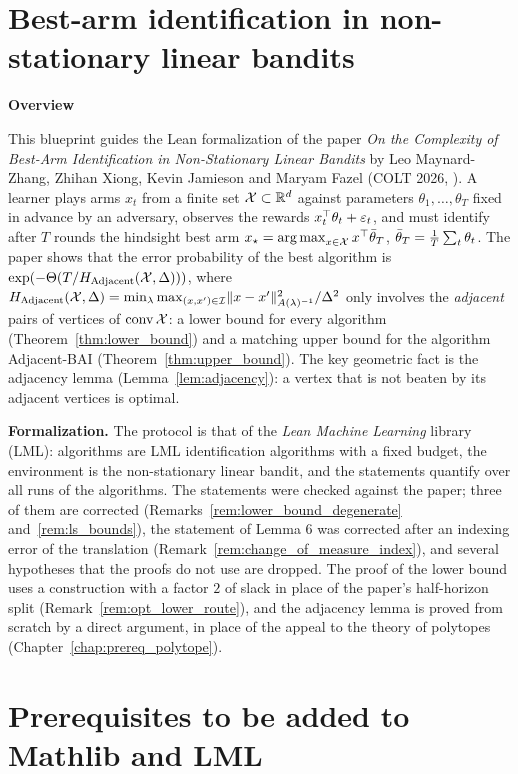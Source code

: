
\part{Best-arm identification in non-stationary linear bandits}
\label{part:main}

\textbf{Overview}

This blueprint guides the Lean formalization of the paper \emph{On the Complexity of Best-Arm
Identification in Non-Stationary Linear Bandits} by Leo Maynard-Zhang, Zhihan Xiong, Kevin Jamieson
and Maryam Fazel (COLT 2026, \cite{maynardzhang2026complexity}). A learner plays arms $x_t$ from a
finite set $\mathcal{X} \subset \mathbb{R}^d$ against parameters $\theta_1, \dots, \theta_T$ fixed in advance by an
adversary, observes the rewards $x_t^\top \theta_t + \varepsilon_t$, and must identify after $T$ rounds the
hindsight best arm $x_\star = \operatorname*{arg\,max}_{x \in \mathcal{X}} x^\top \bar{\theta}_T$, $\bar{\theta}_T = \frac1T
\sum_t \theta_t$. The paper shows that the error probability of the best algorithm is
$\exp(-\Theta(T / H_{\mathrm{Adjacent}}(\mathcal{X}, \Delta)))$, where
$H_{\mathrm{Adjacent}}(\mathcal{X}, \Delta) = \min_\lambda \max_{(x, x') \in \mathcal{I}} \lVert x - x' \rVert^2_{A(\lambda)^{-1}} / \Delta^2$
only involves the \emph{adjacent} pairs of vertices of $\operatorname{conv} \mathcal{X}$: a lower bound for every algorithm
(Theorem~\ref{thm:lower_bound}) and a matching upper bound for the algorithm Adjacent-BAI
(Theorem~\ref{thm:upper_bound}). The key geometric fact is the adjacency lemma
(Lemma~\ref{lem:adjacency}): a vertex that is not beaten by its adjacent vertices is optimal.

\textbf{Formalization.} The protocol is that of the \emph{Lean Machine Learning} library (LML):
algorithms are LML identification algorithms with a fixed budget, the environment is the
non-stationary linear bandit, and the statements quantify over all runs of the algorithms. The
statements were checked against the paper; three of them are corrected
(Remarks~\ref{rem:lower_bound_degenerate} and~\ref{rem:ls_bounds}), the statement of Lemma 6 was
corrected after an indexing error of the translation (Remark~\ref{rem:change_of_measure_index}),
and several hypotheses that the proofs do not use are dropped. The proof of the lower bound uses a construction with a factor $2$
of slack in place of the paper's half-horizon split (Remark~\ref{rem:opt_lower_route}), and the
adjacency lemma is proved from scratch by a direct argument, in place of the appeal to the theory
of polytopes (Chapter~\ref{chap:prereq_polytope}).






\part{Prerequisites to be added to Mathlib and LML}
\label{part:prereq}





